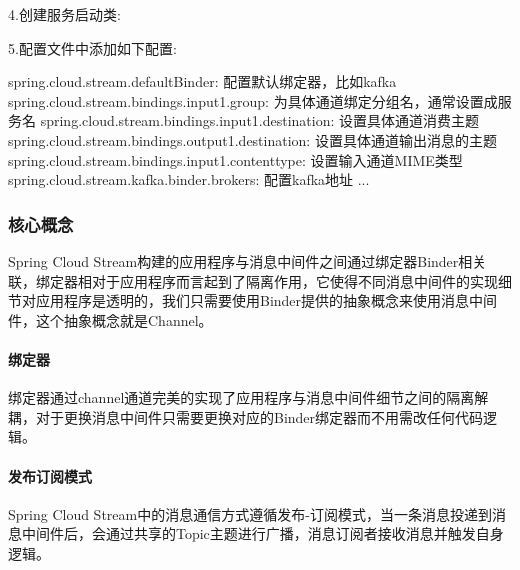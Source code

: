 \documentclass[letterpaper,10pt,english]{sphinxmanual}
\begin{document}
4.创建服务启动类:

\begin{sphinxVerbatim}[commandchars=\\\{\}]
   

       \PYG{p}{[}\PYG{p}{]}  
         

\end{sphinxVerbatim}

5.配置文件中添加如下配置:

\begin{sphinxVerbatim}[commandchars=\\\{\}]
spring.cloud.stream.defaultBinder: 配置默认绑定器，比如kafka
spring.cloud.stream.bindings.input1.group: 为具体通道绑定分组名，通常设置成服务名
spring.cloud.stream.bindings.input1.destination: 设置具体通道消费主题
spring.cloud.stream.bindings.output1.destination: 设置具体通道输出消息的主题
spring.cloud.stream.bindings.input1.content\PYGZhy{}type: 设置输入通道MIME类型
spring.cloud.stream.kafka.binder.brokers: 配置kafka地址
...
\end{sphinxVerbatim}


\subsubsection{核心概念}
\label{\detokenize{01.spring-cloud/07.stream/stream_01:id3}}
Spring Cloud Stream构建的应用程序与消息中间件之间通过绑定器Binder相关联，绑定器相对于应用程序而言起到了隔离作用，它使得不同消息中间件的实现细节对应用程序是透明的，我们只需要使用Binder提供的抽象概念来使用消息中间件，这个抽象概念就是Channel。


\paragraph{绑定器}
\label{\detokenize{01.spring-cloud/07.stream/stream_01:id4}}
绑定器通过channel通道完美的实现了应用程序与消息中间件细节之间的隔离解耦，对于更换消息中间件只需要更换对应的Binder绑定器而不用需改任何代码逻辑。


\paragraph{发布订阅模式}
\label{\detokenize{01.spring-cloud/07.stream/stream_01:id5}}
Spring Cloud Stream中的消息通信方式遵循发布-订阅模式，当一条消息投递到消息中间件后，会通过共享的Topic主题进行广播，消息订阅者接收消息并触发自身逻辑。
\end{document}
